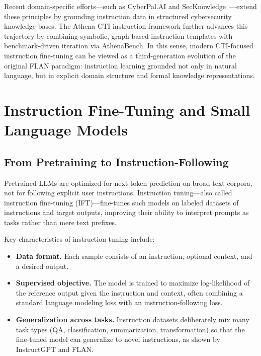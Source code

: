 \documentclass[sigconf]{acmart}
\begin{document}
Recent domain-specific efforts---such as CyberPal.AI and SecKnowledge~\cite{levi2024cyberpal,levi2025toward}---extend these principles by grounding instruction data in structured cybersecurity knowledge bases. The Athena CTI instruction framework further advances this trajectory by combining symbolic, graph-based instruction templates with benchmark-driven iteration via AthenaBench. In this sense, modern CTI-focused instruction fine-tuning can be viewed as a third-generation evolution of the original FLAN paradigm: instruction learning grounded not only in natural language, but in explicit domain structure and formal knowledge representations.


\section{Instruction Fine-Tuning and Small Language Models}
\label{sec:ift-slm}

\subsection{From Pretraining to Instruction-Following}

Pretrained LLMs are optimized for next-token prediction on broad text corpora, not for following explicit user instructions. Instruction tuning---also called instruction fine-tuning (IFT)---fine-tunes such models on labeled datasets of instructions and target outputs, improving their ability to interpret prompts as tasks rather than mere text prefixes.\cite{wei2022flan,ouyang2022instructgpt}

Key characteristics of instruction tuning include:

\begin{itemize}
  \item \textbf{Data format.} Each sample consists of an instruction, optional context, and a desired output.
  \item \textbf{Supervised objective.} The model is trained to maximize log-likelihood of the reference output given the instruction and context, often combining a standard language modeling loss with an instruction-following loss.
  \item \textbf{Generalization across tasks.} Instruction datasets deliberately mix many task types (QA, classification, summarization, transformation) so that the fine-tuned model can generalize to novel instructions, as shown by InstructGPT and FLAN.\cite{wei2022flan,ouyang2022instructgpt}
\end{itemize}
\end{document}
